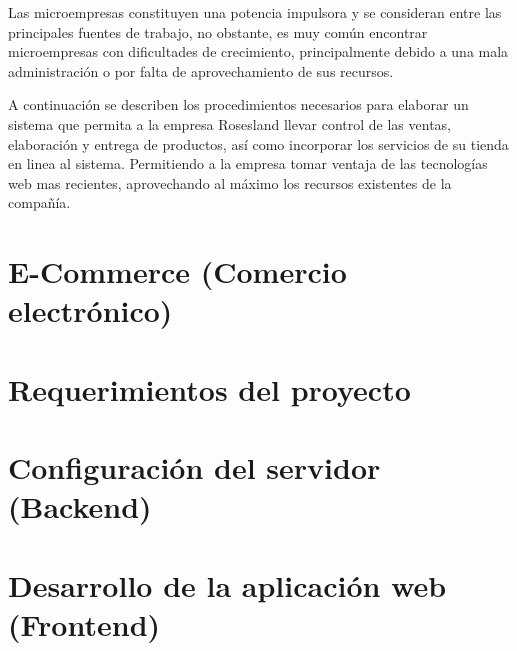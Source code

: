 Las microempresas constituyen una potencia impulsora y se consideran entre las principales fuentes de trabajo, no obstante, es muy común encontrar microempresas con dificultades de crecimiento, principalmente debido a una mala administración o por falta de aprovechamiento de sus recursos.
\vspace{0.8cm}

A continuación se describen los procedimientos necesarios para elaborar un sistema que permita a la empresa Rosesland llevar control de las ventas, elaboración y entrega de productos, así como incorporar los servicios de su tienda en linea al sistema. Permitiendo a la empresa tomar ventaja de las tecnologías web mas recientes, aprovechando al máximo los recursos existentes de la compañía.

\section{E-Commerce (Comercio electrónico)}


\section{Requerimientos del proyecto}


\newpage
\section{Configuración del servidor (Backend)}


\newpage
\section{Desarrollo de la aplicación web (Frontend)}

